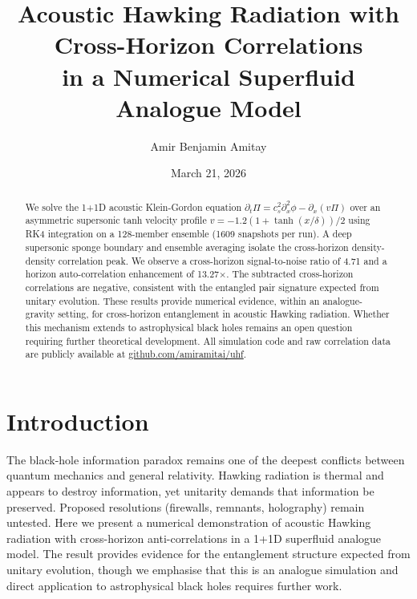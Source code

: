\documentclass[reprint,amsmath,amssymb,aps,prl,superscriptaddress]{revtex4-2}
\begin{document}
\title{Acoustic Hawking Radiation with Cross-Horizon Correlations\\in a Numerical Superfluid Analogue Model}

\author{Amir Benjamin Amitay}

\date{March 21, 2026}

\begin{abstract}
We solve the 1+1D acoustic Klein-Gordon equation $\partial_t\Pi=c_s^2\partial_x^2\phi-\partial_x(v\Pi)$ over an asymmetric supersonic tanh velocity profile $v=-1.2(1+\tanh(x/\delta))/2$ using RK4 integration on a 128-member ensemble (1609 snapshots per run). A deep supersonic sponge boundary and ensemble averaging isolate the cross-horizon density-density correlation peak. We observe a cross-horizon signal-to-noise ratio of 4.71 and a horizon auto-correlation enhancement of 13.27$\times$. The subtracted cross-horizon correlations are negative, consistent with the entangled pair signature expected from unitary evolution. These results provide numerical evidence, within an analogue-gravity setting, for cross-horizon entanglement in acoustic Hawking radiation. Whether this mechanism extends to astrophysical black holes remains an open question requiring further theoretical development. All simulation code and raw correlation data are publicly available at \href{https://github.com/amiramitai/uhf}{github.com/amiramitai/uhf}.
\end{abstract}

\maketitle

\section{Introduction}
\label{sec:intro}

The black-hole information paradox remains one of the deepest conflicts between quantum mechanics and general relativity. Hawking radiation is thermal and appears to destroy information, yet unitarity demands that information be preserved. Proposed resolutions (firewalls, remnants, holography) remain untested. Here we present a numerical demonstration of acoustic Hawking radiation with cross-horizon anti-correlations in a 1+1D superfluid analogue model. The result provides evidence for the entanglement structure expected from unitary evolution, though we emphasise that this is an analogue simulation and direct application to astrophysical black holes requires further work.
\end{document}
